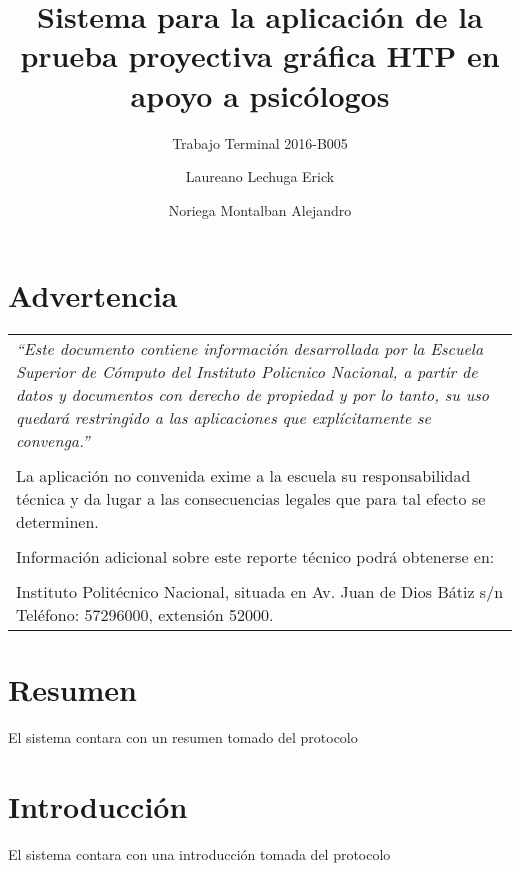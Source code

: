 \documentclass[oneside,10pt]{book}
\title{Sistema para la aplicación de la prueba proyectiva gráfica HTP en apoyo a psicólogos}
\subtitle{Trabajo Terminal 2016-B005}
\author{Laureano Lechuga Erick  \and  \color{authorColor} Noriega Montalban Alejandro}
\begin{document}
\maketitle
\thispagestyle{empty}
\tableofcontents

\chapter*{Advertencia}

\begin{center}
\begin{tabular}{ ||m{35em}|| } 
 \hline
 \hline
 \textit{``Este documento contiene información desarrollada por la Escuela Superior de Cómputo del Instituto Policnico Nacional, a partir de datos y documentos con derecho de propiedad y por lo tanto, su uso quedará restringido a las aplicaciones que explícitamente se convenga.''}\\
 \\
 La aplicación no convenida exime a la escuela su responsabilidad técnica y da lugar a las consecuencias legales que para tal efecto se determinen.\\
 \\
 Información adicional sobre este reporte técnico podrá obtenerse en:\\
 \\
 Instituto Politécnico Nacional, situada en Av. Juan de Dios Bátiz s/n Teléfono: 57296000, extensión 52000.\\ 
 \hline
 \hline
\end{tabular}
\end{center}

 
\chapter*{Resumen}
El sistema contara con un resumen tomado del protocolo

\chapter*{Introducción}
El sistema contara con una introducción tomada del protocolo

\end{document}
